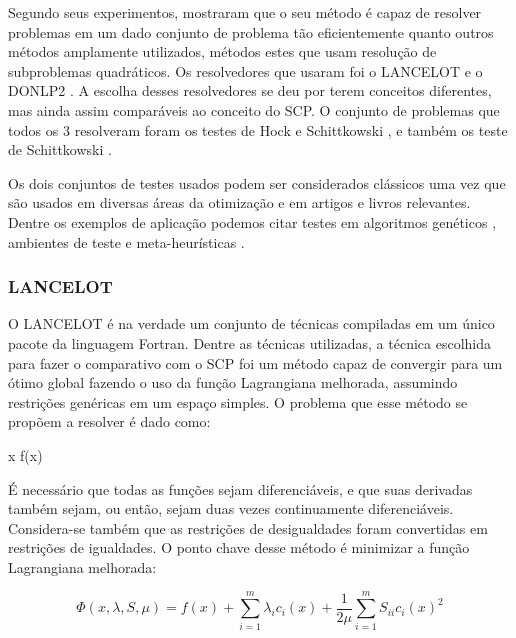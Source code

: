 Segundo seus experimentos, mostraram que o seu método é capaz de resolver problemas em um dado
conjunto de problema tão eficientemente quanto outros métodos amplamente utilizados, métodos
estes que usam resolução de subproblemas quadráticos. Os resolvedores que usaram foi o LANCELOT
\cite{conn1991globally} e o DONLP2 \cite{spellucci1999donlp2}. A escolha desses resolvedores se
deu por terem conceitos diferentes, mas ainda assim comparáveis ao conceito do SCP. O conjunto
de problemas que todos os 3 resolveram foram os testes de Hock e Schittkowski \cite{Hock1981}, e
também os teste de Schittkowski \cite{Schittkowski1987}.

Os dois conjuntos de testes usados podem ser considerados clássicos uma vez que são usados em
diversas áreas da otimização e em artigos e livros relevantes. Dentre os exemplos de aplicação
podemos citar testes em algoritmos genéticos \cite{Deb_2000, Joines}, ambientes de teste
\cite{Bongartz_1995} e meta-heurísticas \cite{Gandomi_2012}.

\subsubsection{LANCELOT}
\label{sec_lancelot}
O LANCELOT \cite{conn1991globally} é na verdade um conjunto de técnicas compiladas em um único
pacote da  linguagem Fortran. Dentre as técnicas utilizadas, a técnica escolhida para fazer o
comparativo com o SCP foi um método capaz de convergir para um ótimo global fazendo o uso da
função Lagrangiana melhorada, assumindo restrições genéricas em um espaço simples. O problema
que esse método se propõem a resolver é dado como:



\vspace{-15pt}
\begin{mini!}
{x}{ f(x) \label{lancelot_obj}}{\label{prob_lancelot}}{}
\end{mini!}

É necessário que todas as funções sejam diferenciáveis, e que suas derivadas também
sejam, ou então, sejam duas vezes continuamente diferenciáveis. Considera-se também
que as restrições de desigualdades foram convertidas em restrições de igualdades. O
ponto chave desse método é minimizar a função Lagrangiana melhorada:

\vspace{-15pt}
\begin{equation}
  \Phi(x, \lambda, S, \mu) = f(x) + \sum_{i=1}^{m} \lambda_i c_i(x) + \frac{1}{2\mu} \sum_{i=1}^m S_{ii} c_i(x)^2
\end{equation}

